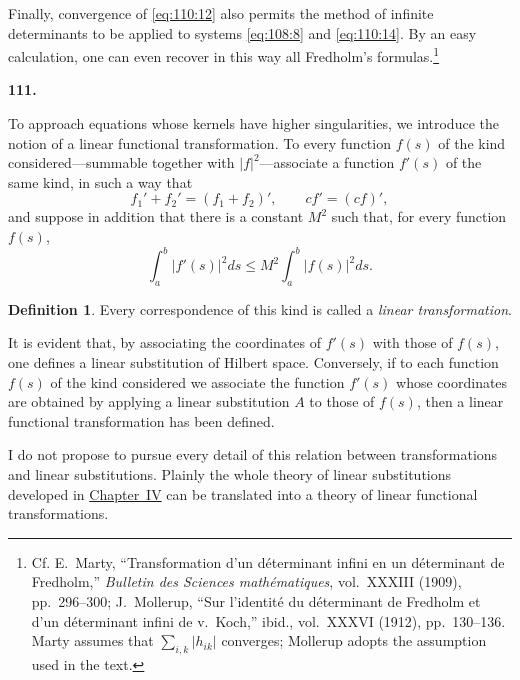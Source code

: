 \documentclass[
  paper=b5,
  fontsize=13pt,
  twoside=true,
  open=any,
  bookmarkpackage=false,
  chapterprefix=true,
  headings=normal
]{scrbook}
\theoremstyle{definition}
\newtheorem*{definition}{Definition}
\newcommand{\numberedparagraph}[1]{%
  \par\medskip\phantomsection\label{sec:#1}%
  \noindent\textbf{#1.}\enspace
}
\begin{document}
Finally, convergence of \eqref{eq:110:12} also permits the method of infinite
determinants to be applied to systems \eqref{eq:108:8} and
\eqref{eq:110:14}.  By an easy calculation, one can even recover in this way
all Fredholm's formulas.\footnote{Cf. E.~Marty, ``Transformation d'un
déterminant infini en un déterminant de Fredholm,'' \emph{Bulletin des Sciences
mathématiques}, vol.~XXXIII (1909), pp.~296--300; J.~Mollerup, ``Sur l'identité
du déterminant de Fredholm et d'un déterminant infini de v.~Koch,'' ibid.,
vol.~XXXVI (1912), pp.~130--136.  Marty assumes that
\(\sum_{i,k}|h_{ik}|\) converges; Mollerup adopts the assumption used in the
text.}

\numberedparagraph{111}
To approach equations whose kernels have higher singularities, we introduce
the notion of a linear functional transformation.  To every function \(f(s)\)
of the kind considered---summable together with \(|f|^2\)---associate a
function \(f'(s)\) of the same kind, in such a way that
\[
  f_1'+f_2'=(f_1+f_2)',
  \qquad cf'=(cf)',
\]
and suppose in addition that there is a constant \(M^2\) such that, for
every function \(f(s)\),
\begin{equation}
  \int_a^b|f'(s)|^2ds\le M^2\int_a^b|f(s)|^2ds.
  \tag{15}\label{eq:111:15}
\end{equation}
\begin{definition}
Every correspondence of this kind is called a \emph{linear transformation}.
\end{definition}
It is evident that, by associating the coordinates of \(f'(s)\) with those of
\(f(s)\), one defines a linear substitution of Hilbert space.  Conversely, if
to each function \(f(s)\) of the kind considered we associate the function
\(f'(s)\) whose coordinates are obtained by applying a linear substitution
\(A\) to those of \(f(s)\), then a linear functional transformation has been
defined.

I do not propose to pursue every detail of this relation between
transformations and linear substitutions.  Plainly the whole theory of linear
substitutions developed in \hyperref[chap:4]{Chapter~IV} can be translated into a theory of
linear functional transformations.
\end{document}
